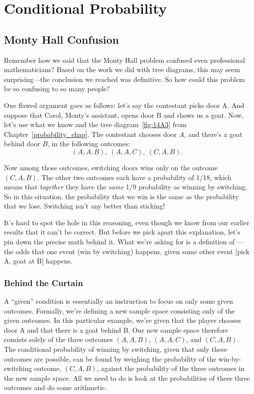 \chapter{Conditional Probability}\label{chap:cond_prob} %

\section{Monty Hall Confusion}\label{sec:confuse_Monty}
Remember how we said that the Monty Hall problem confused even
professional mathematicians?  Based on the work we did with tree
diagrams, this may seem surprising---the conclusion we reached was
definitive.  So how could this problem be so confusing to so many
people?

One flawed argument goes as follows: let's say the contestant picks
door A.  And suppose that Carol, Monty's assistant, opens door B and
shows us a goat.  Now, let's use what we know and the tree
diagram~\ref{fig:14A3} from Chapter~\ref{probability_chap}.  The
contestant chooses door $A$, and there's a goat behind door $B$, in
the following outcomes:
\[
(A, A, B),\ (A, A, C),\ (C, A, B).
\]

Now among those outcomes, switching doors wins only on the outcome
$(C, A, B)$.  The other two outcomes each have a probability of 1/18,
which means that \emph{together} they have the \emph{same} 1/9
probability as winning by switching.  So in this situation, the
probability that we win is the same as the probability that we lose.
Switching isn't any better than sticking!

It's hard to spot the hole in this reasoning, even though we know from
our earlier results that it can't be correct.  But before we pick
apart this explanation, let's pin down the precise math behind it.
What we're asking for is a definition of ---the odds that one event (win by switching) happens,
given some other event [pick A, goat at B] happens.

\subsection{Behind the Curtain}

A ``given'' condition is essentially an instruction to focus on only
some given outcomes.  Formally, we're defining a new sample space
consisting only of the given outcomes.  In this particular example,
we're given that the player chooses door A and that there is a goat
behind B.  Our new sample space therefore consists solely of the three
outcomes $(A, A, B)$, $(A, A, C)$, and $(C, A, B)$.  The conditional
probability of winning by switching, given that only these outcomes
are possible, can be found by weighing the probability of the
win-by-switching outcome, $(C, A, B)$, against the probability of the
three outcomes in the new sample space.  All we need to do is look at
the probabilities of these three outcomes and do some arithmetic.

